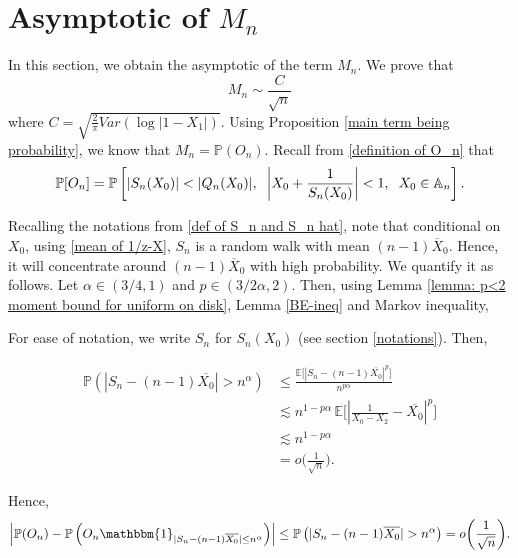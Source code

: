 \documentclass[9pt,a4paper,reqno]{amsart}
\theoremstyle{mine}
\theoremstyle{definition}
\theoremstyle{remark}
\newcommand{\mb}{\mathbb}
\begin{document}
    
        


\section{Asymptotic of \texorpdfstring{$M_n$}{Mn}} \label{The-M-Analysis}

In this section, we obtain the asymptotic of the term $M_n$. We prove that
\begin{equation}\label{M-asymp}
    M_n \sim \frac{C}{\sqrt{n}}
\end{equation}
where $C = \sqrt{\frac{2}{\pi} Var(\log|1-X_1|)}$. Using Proposition \ref{main term being probability}, we know that $M_n = \mb{P}(O_n)$. Recall from \eqref{definition of O_n} that 
\begin{align}\label{main probability event}
    \mb{P}[O_n]= \mb{P}\left[ |S_n(X_0)|< |Q_n(X_0)|, \hspace{2mm}  \left| X_0+\frac{1}{S_n(X_0)} \right|<1, \hspace{2mm}X_0 \in \mb{A}_n \right].
\end{align}

Recalling the notations from \eqref{def of S_n and S_n hat}, note that conditional on $X_0$, using \eqref{mean of 1/z-X}, $S_n$ is a random walk with mean $(n-1)\overline{X}_0$. Hence, it will concentrate around $(n-1)\overline{X}_0$ with high probability. We quantify it as follows. Let $\alpha \in (3/4, 1)$ and $p \in (3/2\alpha,2)$. Then, using Lemma \ref{lemma: p<2 moment bound for uniform on disk}, Lemma \ref{BE-ineq} and Markov inequality, 

For ease of notation, we write $S_n$ for $S_n(X_0)$ (see section \ref{notations}). Then,  

\begin{align}\label{use-of-BDG}
    \mb{P}\left({|S_n-(n-1)\overline{X_0}| > n^\alpha}\right)  &\leq \frac{\mb{E}\bigr[\left|{S_n-(n-1) \overline{X_0}}\right|^p \bigl]}{n^{p\alpha}} \\ \nonumber& \lesssim  {n^{1-p\alpha} \,\mb{E}\biggl[\left|{\frac{1}{X_0-X_2}-\overline{X_0}}\right|^p} \biggr] \\\nonumber
     & \lesssim n^{1-p\alpha} \\\nonumber
     & = o\biggl(\frac{1}{\sqrt{n}}\biggr).\nonumber
\end{align}

Hence, 
\begin{align*}
    \left|\mb{P}(O_n) - \mb{P}\left(O_n \mathbbm{1}_{|S_n- (n-1) \overline{X_0}| \leq n^\alpha}\right)\right| 
    \leq \mb{P}\left({|S_n- (n-1) \overline{X_0}| > n^\alpha}\right) = o\biggl(\frac{1}{\sqrt{n}}\biggr).
\end{align*}
\end{document}
